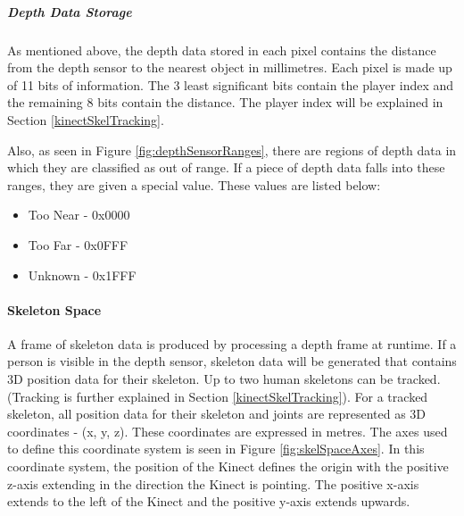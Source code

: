 \subparagraph{Depth Data Storage}
As mentioned above, the depth data stored in each pixel contains the distance from the depth sensor to the nearest object in millimetres. Each pixel is made up of 11 bits of information. The 3 least significant bits contain the player index and the remaining 8 bits contain the distance. \cite{msdnDepthCamKinect2017} The player index will be explained in Section \ref{kinectSkelTracking}. 

Also, as seen in Figure \ref{fig:depthSensorRanges}, there are regions of depth data in which they are classified as out of range. If a piece of depth data falls into these ranges, they are given a special value. \cite{msdnCoSpaces2017} These values are listed below:

\begin{itemize}
	\item Too Near - 0x0000
	\item Too Far - 0x0FFF
	\item Unknown - 0x1FFF
\end{itemize}  

\paragraph{Skeleton Space}
A frame of skeleton data is produced by processing a depth frame at runtime. If a person is visible in the depth sensor, skeleton data will be generated that contains 3D position data for their skeleton. Up to two human skeletons can be tracked. (Tracking is further explained in Section \ref{kinectSkelTracking}). For a tracked skeleton, all position data for their skeleton and joints are represented as 3D coordinates - (x, y, z). These coordinates are expressed in metres. The axes used to define this coordinate system is seen in Figure \ref{fig:skelSpaceAxes}. In this coordinate system, the position of the Kinect defines the origin with the positive z-axis extending in the direction the Kinect is pointing. The positive x-axis extends to the left of the Kinect and the positive y-axis extends upwards. \cite{msdnCoSpaces2017}


